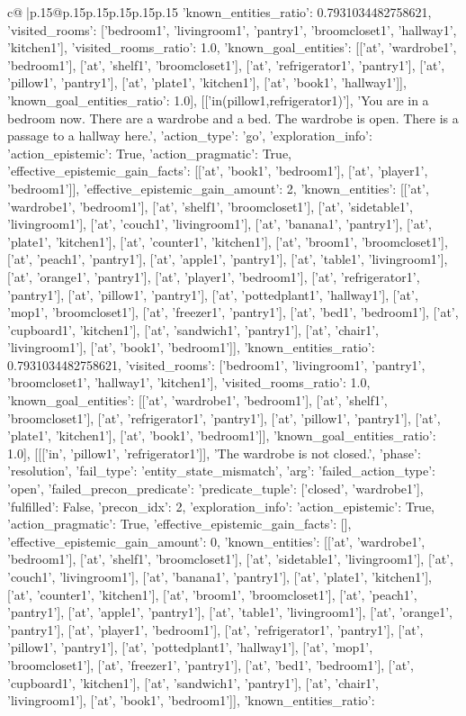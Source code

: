 \documentclass{article}
\begin{document}
{\begin{supertabular}{c@{$\;$}|p{.15\linewidth}@{}p{.15\linewidth}p{.15\linewidth}p{.15\linewidth}p{.15\linewidth}p{.15\linewidth}}
{{{'known_entities_ratio': 0.7931034482758621, 'visited_rooms': ['bedroom1', 'livingroom1', 'pantry1', 'broomcloset1', 'hallway1', 'kitchen1'], 'visited_rooms_ratio': 1.0, 'known_goal_entities': [['at', 'wardrobe1', 'bedroom1'], ['at', 'shelf1', 'broomcloset1'], ['at', 'refrigerator1', 'pantry1'], ['at', 'pillow1', 'pantry1'], ['at', 'plate1', 'kitchen1'], ['at', 'book1', 'hallway1']], 'known_goal_entities_ratio': 1.0}}], [['in(pillow1,refrigerator1)'], 'You are in a bedroom now. There are a wardrobe and a bed. The wardrobe is open. There is a passage to a hallway here.', {'action_type': 'go', 'exploration_info': {'action_epistemic': True, 'action_pragmatic': True, 'effective_epistemic_gain_facts': [['at', 'book1', 'bedroom1'], ['at', 'player1', 'bedroom1']], 'effective_epistemic_gain_amount': 2, 'known_entities': [['at', 'wardrobe1', 'bedroom1'], ['at', 'shelf1', 'broomcloset1'], ['at', 'sidetable1', 'livingroom1'], ['at', 'couch1', 'livingroom1'], ['at', 'banana1', 'pantry1'], ['at', 'plate1', 'kitchen1'], ['at', 'counter1', 'kitchen1'], ['at', 'broom1', 'broomcloset1'], ['at', 'peach1', 'pantry1'], ['at', 'apple1', 'pantry1'], ['at', 'table1', 'livingroom1'], ['at', 'orange1', 'pantry1'], ['at', 'player1', 'bedroom1'], ['at', 'refrigerator1', 'pantry1'], ['at', 'pillow1', 'pantry1'], ['at', 'pottedplant1', 'hallway1'], ['at', 'mop1', 'broomcloset1'], ['at', 'freezer1', 'pantry1'], ['at', 'bed1', 'bedroom1'], ['at', 'cupboard1', 'kitchen1'], ['at', 'sandwich1', 'pantry1'], ['at', 'chair1', 'livingroom1'], ['at', 'book1', 'bedroom1']], 'known_entities_ratio': 0.7931034482758621, 'visited_rooms': ['bedroom1', 'livingroom1', 'pantry1', 'broomcloset1', 'hallway1', 'kitchen1'], 'visited_rooms_ratio': 1.0, 'known_goal_entities': [['at', 'wardrobe1', 'bedroom1'], ['at', 'shelf1', 'broomcloset1'], ['at', 'refrigerator1', 'pantry1'], ['at', 'pillow1', 'pantry1'], ['at', 'plate1', 'kitchen1'], ['at', 'book1', 'bedroom1']], 'known_goal_entities_ratio': 1.0}}], [[['in', 'pillow1', 'refrigerator1']], 'The wardrobe is not closed.', {'phase': 'resolution', 'fail_type': 'entity_state_mismatch', 'arg': {'failed_action_type': 'open', 'failed_precon_predicate': {'predicate_tuple': ['closed', 'wardrobe1'], 'fulfilled': False, 'precon_idx': 2}}, 'exploration_info': {'action_epistemic': True, 'action_pragmatic': True, 'effective_epistemic_gain_facts': [], 'effective_epistemic_gain_amount': 0, 'known_entities': [['at', 'wardrobe1', 'bedroom1'], ['at', 'shelf1', 'broomcloset1'], ['at', 'sidetable1', 'livingroom1'], ['at', 'couch1', 'livingroom1'], ['at', 'banana1', 'pantry1'], ['at', 'plate1', 'kitchen1'], ['at', 'counter1', 'kitchen1'], ['at', 'broom1', 'broomcloset1'], ['at', 'peach1', 'pantry1'], ['at', 'apple1', 'pantry1'], ['at', 'table1', 'livingroom1'], ['at', 'orange1', 'pantry1'], ['at', 'player1', 'bedroom1'], ['at', 'refrigerator1', 'pantry1'], ['at', 'pillow1', 'pantry1'], ['at', 'pottedplant1', 'hallway1'], ['at', 'mop1', 'broomcloset1'], ['at', 'freezer1', 'pantry1'], ['at', 'bed1', 'bedroom1'], ['at', 'cupboard1', 'kitchen1'], ['at', 'sandwich1', 'pantry1'], ['at', 'chair1', 'livingroom1'], ['at', 'book1', 'bedroom1']], 'known_entities_ratio': }}}
\end{supertabular}}
\end{document}
